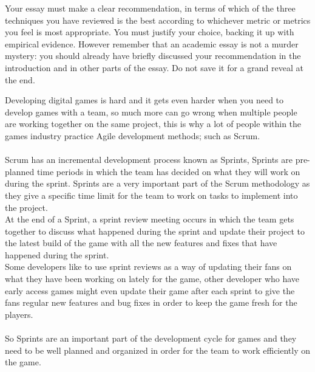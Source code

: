 \documentclass{scrartcl}
\begin{document}
Your essay must make a clear recommendation, in terms of which of the three techniques you have reviewed is the best according to whichever metric or metrics you feel is most appropriate. You must justify your choice, backing it up with empirical evidence. However remember that an academic essay is not a murder mystery: you should already have briefly discussed your recommendation in the introduction and in other parts of the essay. Do not save it for a grand reveal at the end.
\fi

Developing digital games is hard and it gets even harder when you need to develop games with a team, so much more can go wrong when multiple people are working together on the same project, this is why a lot of people within the games industry practice Agile development methods; such as Scrum.
\\~\\
Scrum has an incremental development process known as Sprints, Sprints are pre-planned time periods in which the team has decided on what they will work on during the sprint. Sprints are a very important part of the Scrum methodology as they give a specific time limit for the team to work on tasks to implement into the project.\\
At the end of a Sprint, a sprint review meeting occurs in which the team gets together to discuss what happened during the sprint and update their project to the latest build of the game with all the new features and fixes that have happened during the sprint.\\
Some developers like to use sprint reviews as a way of updating their fans on what they have been working on lately for the game, other developer who have early access games might even update their game after each sprint to give the fans regular new features and bug fixes in order to keep the game fresh for the players.
\\~\\
So Sprints are an important part of the development cycle for games and they need to be well planned and organized in order for the team to work efficiently on the game.
\end{document}
